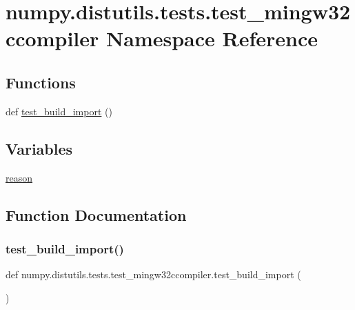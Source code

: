 \hypertarget{namespacenumpy_1_1distutils_1_1tests_1_1test__mingw32ccompiler}{}\section{numpy.\+distutils.\+tests.\+test\+\_\+mingw32ccompiler Namespace Reference}
\label{namespacenumpy_1_1distutils_1_1tests_1_1test__mingw32ccompiler}
\subsection*{Functions}
\begin{DoxyCompactItemize}
\item 
def \hyperlink{namespacenumpy_1_1distutils_1_1tests_1_1test__mingw32ccompiler_ada8f557df558ecbc30fa150a08bbc8a1}{test\+\_\+build\+\_\+import} ()
\end{DoxyCompactItemize}
\subsection*{Variables}
\begin{DoxyCompactItemize}
\item 
\hyperlink{namespacenumpy_1_1distutils_1_1tests_1_1test__mingw32ccompiler_ae41e38604dea4afd61a81c274bfc05e9}{reason}
\end{DoxyCompactItemize}


\subsection{Function Documentation}
\mbox{\label{namespacenumpy_1_1distutils_1_1tests_1_1test__mingw32ccompiler_ada8f557df558ecbc30fa150a08bbc8a1}} 
\subsubsection{\texorpdfstring{test\+\_\+build\+\_\+import()}{test\_build\_import()}}
{\footnotesize\ttfamily def numpy.\+distutils.\+tests.\+test\+\_\+mingw32ccompiler.\+test\+\_\+build\+\_\+import (\begin{DoxyParamCaption}{ }\end{DoxyParamCaption})}

